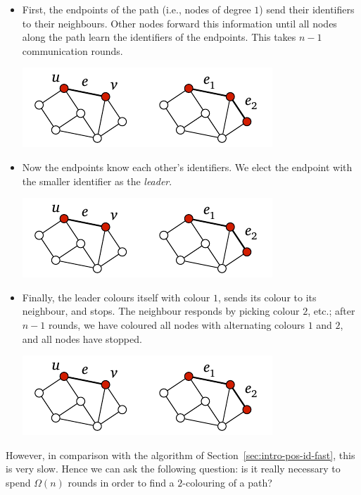 \begin{itemize}
    \item First, the endpoints of the path (i.e., nodes of degree $1$) send their identifiers to their neighbours. Other nodes forward this information until all nodes along the path learn the identifiers of the endpoints. This takes $n-1$ communication rounds.
    \begin{center}
        \includegraphics[page=\PIntroTwoColA]{figs.pdf}
    \end{center}
    \item Now the endpoints know each other's identifiers. We elect the endpoint with the smaller identifier as the \emph{leader}.
    \begin{center}
        \includegraphics[page=\PIntroTwoColB]{figs.pdf}
    \end{center}
    \item Finally, the leader colours itself with colour $1$, sends its colour to its neighbour, and stops. The neighbour responds by picking colour $2$, etc.; after $n-1$ rounds, we have coloured all nodes with alternating colours $1$ and $2$, and all nodes have stopped.
    \begin{center}
        \includegraphics[page=\PIntroColTwo]{figs.pdf}
    \end{center}
\end{itemize}
However, in comparison with the algorithm of Section~\ref{sec:intro-pos-id-fast}, this is very slow. Hence we can ask the following question: is it really necessary to spend $\Omega(n)$ rounds in order to find a $2$-colouring of a path?

